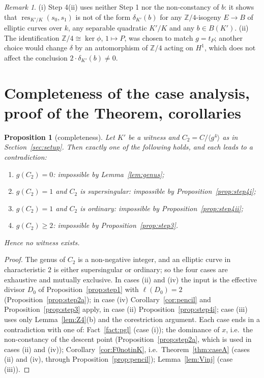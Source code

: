 \documentclass[11pt]{amsart}
\newtheorem{proposition}[theorem]{Proposition}
\theoremstyle{definition}
\theoremstyle{remark}
\newtheorem{remark}[theorem]{Remark}
\newcommand{\Z}{\mathbb Z}
\newcommand{\res}{\operatorname{res}}
\begin{document}
\begin{remark}\label{rem:iso}
(i) Step 4(ii) uses neither Step 1 nor the non-constancy of $b$: it shows that
$\res_{K'/K}(s_0,s_1)$ is not of the form $\delta_{K'}(b)$ for any $\Z/4$-isogeny
$E\to B$ of elliptic curves over $k$, any separable quadratic $K'/K$ and any $b\in B(K')$.
(ii) The identification $\Z/4\cong\ker\phi$, $1\mapsto P$, was chosen to match
$g=t_P$; another choice would change $\delta$ by an automorphism of $\Z/4$ acting on
$H^1$, which does not affect the conclusion $2\cdot\delta_{K'}(b)\ne0$.
\end{remark}

\section{Completeness of the case analysis, proof of the Theorem, corollaries}\label{sec:assembly}

\begin{proposition}[completeness]\label{prop:complete}
Let $K'$ be a witness and $C_2=C/\langle g^4\rangle$ as in Section~\ref{sec:setup}. Then
exactly one of the following holds, and each leads to a contradiction:
\begin{enumerate}[label=\textup{(\roman*)}]
\item $g(C_2)=0$: impossible by Lemma~\ref{lem:genus};
\item $g(C_2)=1$ and $C_2$ is supersingular: impossible by Proposition~\ref{prop:step4i};
\item $g(C_2)=1$ and $C_2$ is ordinary: impossible by Proposition~\ref{prop:step4ii};
\item $g(C_2)\ge2$: impossible by Proposition~\ref{prop:step3}.
\end{enumerate}
Hence no witness exists.
\end{proposition}

\begin{proof}
The genus of $C_2$ is a non-negative integer, and an elliptic curve in characteristic $2$
is either supersingular or ordinary; so the four cases are exhaustive and mutually
exclusive. In cases (ii) and (iv) the input is the effective divisor $D_0$ of
Proposition~\ref{prop:step1} with $\ell(D_0)=2$ (Proposition~\ref{prop:step2a}); in
case (iv) Corollary~\ref{cor:pencil} and Proposition~\ref{prop:step3} apply, in case (ii)
Proposition~\ref{prop:step4i}; case (iii) uses only Lemma~\ref{lem:Z4}(b) and the
corestriction argument. Each case ends in a contradiction with one of: Fact~\ref{fact:pgl} (case (i));
the dominance of $x$, i.e.\ the non-constancy of the descent point
(Proposition~\ref{prop:step2a}, which is used in cases (ii) and (iv)); Corollary~\ref{cor:F0notinK},
i.e.\ Theorem~\ref{thm:caseA} (cases (ii) and (iv), through Proposition~\ref{prop:pencil});
Lemma~\ref{lem:Vinj} (case (iii)).
\end{proof}
\end{document}
